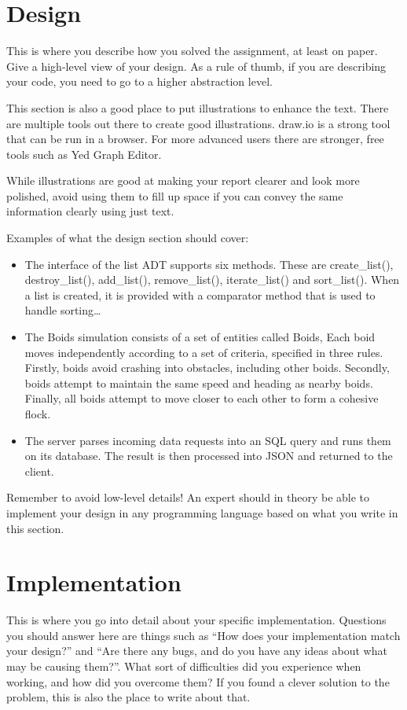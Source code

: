 \begin{flushleft}
\section{Design }
This is where you describe how you solved the assignment, at least on paper. Give a high-level view of your design. As a rule of thumb, if you are describing your code, you need to go to a higher abstraction level.


\bigskip

This section is also a good place to put illustrations to enhance the text. There are multiple tools out there to create good illustrations. draw.io is a strong tool that can be run in a browser. For more advanced users there are stronger, free tools such as Yed Graph Editor.


\bigskip

While illustrations are good at making your report clearer and look more polished, avoid using them to fill up space if you can convey the same information clearly using just text.


\bigskip

Examples of what the design section should cover:

\begin{itemize}
\item The interface of the list ADT supports six methods. These are create\_list(), destroy\_list(), add\_list(), remove\_list(), iterate\_list() and sort\_list(). When a list is created, it is provided with a comparator method that is used to handle sorting{\dots}
\item The Boids simulation consists of a set of entities called Boids, Each boid moves independently according to a set of criteria, specified in three rules. Firstly, boids avoid crashing into obstacles, including other boids. Secondly, boids attempt to maintain the same speed and heading as nearby boids. Finally, all boids attempt to move closer to each other to form a cohesive flock.
\item The server parses incoming data requests into an SQL query and runs them on its database. The result is then processed into JSON and returned to the client.
\end{itemize}

\bigskip

Remember to avoid low-level details! An expert should in theory be able to implement your design in any programming language based on what you write in this section.

\section{Implementation}
This is where you go into detail about your specific implementation. Questions you should answer here are things such as ``How does your implementation match your design?'' and ``Are there any bugs, and do you have any ideas about what may be causing them?''. What sort of difficulties did you experience when working, and how did you overcome them? If you found a clever solution to the problem, this is also the place to write about that.


\end{flushleft}
